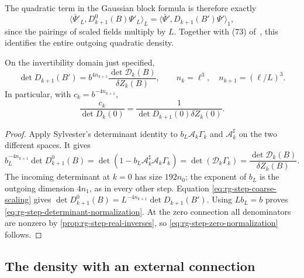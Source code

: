 \documentclass[11pt,letterpaper,reqno]{amsart}
\newcommand{\exteq}[2]{(#1) of~\cite{#2}}
\begin{document}
The quadratic term in the Gaussian block formula is
therefore exactly
\[
 \langle\bar\Psi'_L,D_{k+1}^0(B)\Psi'_L\rangle_L
                         =\langle\bar\Psi',D_{k+1}(B')\Psi'\rangle_1,
\]
since the pairings of scaled fields multiply by $L$.
Together with \exteq{73}{FermionBlockManuscript},
this identifies the entire outgoing quadratic density.

\begin{proposition}\label{prop:rg-step-determinant-normalization}
On the invertibility domain just specified,
\begin{equation}\label{eq:rg-step-determinant-normalization}
 \det D_{k+1}(B')=
           b^{4n_{k+1}}\frac{\det\mathcal D_k(B)}{\delta Z_k(B)},
 \qquad n_k=\ell^3,\quad n_{k+1}=(\ell/L)^3.
\end{equation}
In particular, with $c_k=b^{-4n_{k+1}}$,
\begin{equation}\label{eq:rg-step-zero-normalization}
 \frac{c_k}{\det D_k(0)}
              =\frac{1}{\det D_{k+1}(0)\delta Z_k(0)}.
\end{equation}
\end{proposition}

\begin{proof}
Apply Sylvester's determinant identity to
$b_L\mathcal A_k\Gamma_k$ and $\mathcal A_k^\sharp$
on the two different spaces. It gives
\[
 b_L^{-4n_{k+1}}\det D_{k+1}^0(B)
       =\det(1-b_L\mathcal A_k^\sharp\mathcal A_k\Gamma_k)
       =\det(\mathcal D_k\Gamma_k)
       =\frac{\det\mathcal D_k(B)}{\delta Z_k(B)}.
\]
The incoming determinant at $k=0$ has size $192n_0$;
the exponent of $b_L$ is the outgoing dimension
$4n_1$, as in every other step.
Equation \eqref{eq:rg-step-coarse-scaling} gives
$\det D_{k+1}^0(B)=L^{-4n_{k+1}}\det D_{k+1}(B')$.
Using $Lb_L=b$ proves
\eqref{eq:rg-step-determinant-normalization}.
At the zero connection all denominators are nonzero
by \cref{prop:rg-step-real-inverses}, so
\eqref{eq:rg-step-zero-normalization} follows.
\end{proof}

\subsection{The density with an external connection}
\label{subsec:rg-step-density}
\end{document}
